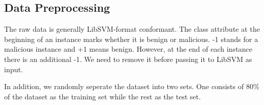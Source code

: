 \documentclass[11pt]{article}
\begin{document}

\subsection{Data Preprocessing}
The raw data is generally LibSVM-format conformant. The class attribute at the beginning of an instance marks whether it is benign or malicious. -1 stands for a malicious instance and +1 means benign. However, at the end of each instance there is an additional -1. We need to remove it before passing it to LibSVM as input.

In addition, we randomly seperate the dataset into two sets. One consists of 80\% of the dataset as the training set while the rest as the test set.


\end{document}
